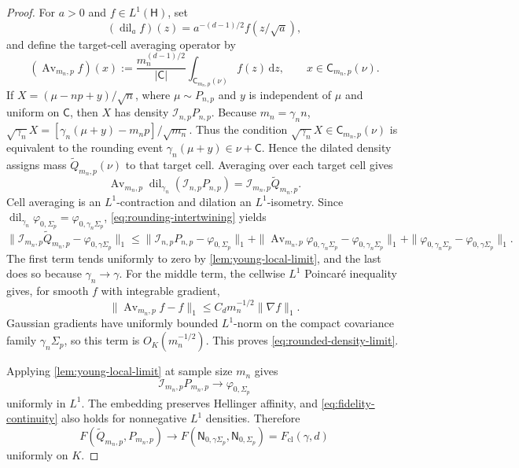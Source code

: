 \documentclass[11pt]{article}
\theoremstyle{remark}
\theoremstyle{plain}
\newcommand{\dd}{\mathrm d}
\newcommand{\Fcl}{F_{\mathrm{cl}}}
\begin{document}
\begin{proof}
For \(a>0\) and \(f\in L^1(\mathsf H)\), set
\[
  (\operatorname{dil}_a f)(z)=a^{-(d-1)/2}f(z/\sqrt a),
\]
and define the target-cell averaging operator by
\[
  (\operatorname{Av}_{m_n,p}f)(x)
  :=\frac{m_n^{(d-1)/2}}{|\mathsf C|}
   \int_{\mathsf C_{m_n,p}(\nu)}f(z)\,\dd z,
  \qquad x\in\mathsf C_{m_n,p}(\nu).
\]
If \(X=(\mu-np+y)/\sqrt n\), where \(\mu\sim P_{n,p}\) and
\(y\) is independent of \(\mu\) and uniform on \(\mathsf C\), then
\(X\) has density \(\mathcal I_{n,p}P_{n,p}\).  Because
\(m_n=\gamma_n n\),
\(\sqrt{\gamma_n}X=
[\gamma_n(\mu+y)-m_np]/\sqrt{m_n}\).  Thus the condition
\(\sqrt{\gamma_n}X\in\mathsf C_{m_n,p}(\nu)\) is equivalent to the
rounding event \(\gamma_n(\mu+y)\in\nu+\mathsf C\).  Hence the dilated
density assigns mass \(\widetilde Q_{m_n,p}(\nu)\) to that target cell.
Averaging over each target cell gives
\begin{equation}\label{eq:rounding-intertwining}
 \operatorname{Av}_{m_n,p}\operatorname{dil}_{\gamma_n}
   (\mathcal I_{n,p}P_{n,p})
 =\mathcal I_{m_n,p}\widetilde Q_{m_n,p}.
\end{equation}
Cell averaging is an \(L^1\)-contraction and dilation an \(L^1\)-isometry.
Since
\(\operatorname{dil}_{\gamma_n}\varphi_{0,\Sigma_p}
=\varphi_{0,\gamma_n\Sigma_p}\), \eqref{eq:rounding-intertwining} yields
\[
  \|\mathcal I_{m_n,p}\widetilde Q_{m_n,p}
       -\varphi_{0,\gamma\Sigma_p}\|_1
  \le \|\mathcal I_{n,p}P_{n,p}-\varphi_{0,\Sigma_p}\|_1
  +\|\operatorname{Av}_{m_n,p}\varphi_{0,\gamma_n\Sigma_p}
               -\varphi_{0,\gamma_n\Sigma_p}\|_1
  +\|\varphi_{0,\gamma_n\Sigma_p}
               -\varphi_{0,\gamma\Sigma_p}\|_1.
\]
The first term tends uniformly to zero by \cref{lem:young-local-limit},
and the last does so because \(\gamma_n\to\gamma\).  For the middle
term, the cellwise \(L^1\) Poincar\'e inequality gives, for smooth \(f\)
with integrable gradient,
\[
  \|\operatorname{Av}_{m_n,p}f-f\|_1
  \le C_d m_n^{-1/2}\|\nabla f\|_1.
\]
Gaussian gradients have uniformly bounded \(L^1\)-norm on the compact
covariance family \(\gamma_n\Sigma_p\), so this term is
\(O_K(m_n^{-1/2})\).  This proves \eqref{eq:rounded-density-limit}.

Applying \cref{lem:young-local-limit} at sample size \(m_n\) gives
\[
  \mathcal I_{m_n,p}P_{m_n,p}\longrightarrow\varphi_{0,\Sigma_p}
\]
uniformly in \(L^1\).  The embedding preserves Hellinger affinity, and
\eqref{eq:fidelity-continuity} also holds for nonnegative \(L^1\) densities.
Therefore
\[
  F(\widetilde Q_{m_n,p},P_{m_n,p})
  \longrightarrow
  F(\mathsf N_{0,\gamma\Sigma_p},\mathsf N_{0,\Sigma_p})
  =\Fcl(\gamma,d)
\]
uniformly on \(K\).
\end{proof}
\end{document}
